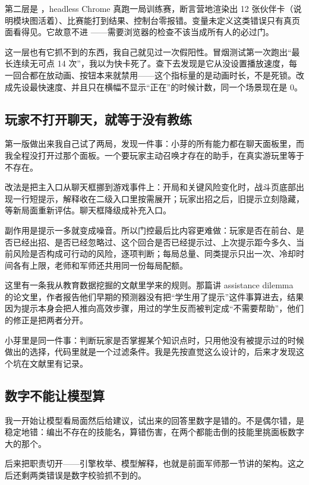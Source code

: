 第二层是 ，headless Chrome 真跑一局训练赛，断言营地渲染出 12 张伙伴卡（说明模块图活着）、比赛能打到结果、控制台零报错。变量未定义这类错误只有真页面看得见。它故意不进 ——需要浏览器的检查不该当成所有人的必过门。

这一层也有它抓不到的东西，我自己就见过一次假阳性。冒烟测试第一次跑出“最长连续无可点 14 次”，我以为快卡死了。查下去发现是它从没设置播放速度，每一回合都在放动画、按钮本来就禁用——这个指标量的是动画时长，不是死锁。改成先设最快速度、并且只在横幅不显示“正在”的时候计数，同一个场景现在是 0。

\subsection{玩家不打开聊天，就等于没有教练}

第一版做出来我自己试了两局，发现一件事：小芽的所有能力都在聊天面板里，而我全程没打开过那个面板。一个要玩家主动召唤才存在的助手，在真实游玩里等于不存在。

改法是把主入口从聊天框挪到游戏事件上：开局和关键风险变化时，战斗页底部出现一行短提示，解释收在二级入口里按需展开；玩家出招之后，旧提示立刻隐藏，等新局面重新评估。聊天框降级成补充入口。

副作用是提示一多就变成噪音。所以门控最后比内容更难做：玩家是否在前台、是否已经出招、是否已经忽略过、这个回合是否已经提示过、上次提示距今多久、当前风险是否构成可行动的风险，逐项判断；每局总量、同类提示只出一次、冷却时间各有上限，老师和军师还共用同一份每局配额。

这里有一条我从教育数据挖掘的文献里学来的规则。那篇讲 assistance dilemma 的论文里，作者报告他们早期的预测器没有把“学生用了提示”这件事算进去，结果因为提示本身会把人推向高效步骤，用过的学生反而被判定成“不需要帮助”，他们的修正是把两者分开。

小芽里是同一件事：判断玩家是否掌握某个知识点时，只用他没有被提示过的时候做出的选择，代码里就是一个过滤条件。我是先按直觉这么设计的，后来才发现这个坑在文献里有记录。

\subsection{数字不能让模型算}

我一开始让模型看局面然后给建议，试出来的回答里数字是错的。不是偶尔错，是稳定地错：编出不存在的技能名，算错伤害，在两个都能击倒的技能里挑面板数字大的那个。

后来把职责切开——引擎枚举、模型解释，也就是前面军师那一节讲的架构。这之后还剩两类错误是数字校验抓不到的。

